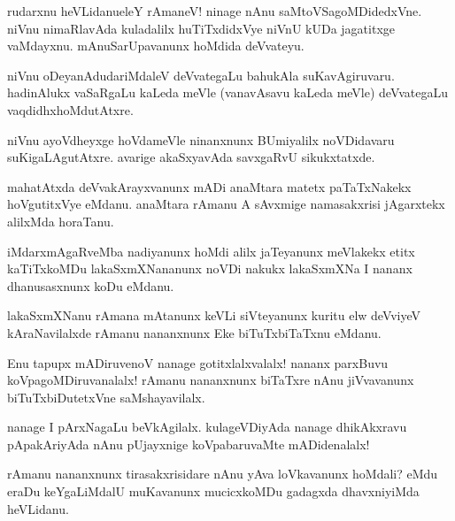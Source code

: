 \begin{mng}
rudarxnu heVLidanu\mdash eleY rAmaneV! ninage nAnu saMtoVSagoMDidedxVne. niVnu nimaRlavAda kuladalilx huTiTxdidxVye niVnU kUDa jagatitxge vaMdayxnu. mAnuSarUpavanunx hoMdida deVvateyu.
\end{mng}

\begin{mng}
niVnu oDeyanAdudariMdaleV deVvategaLu bahukAla suKavAgiruvaru. hadinAlukx vaSaRgaLu kaLeda meVle (vanavAsavu kaLeda meVle) deVvategaLu vaqdidhxhoMdutAtxre.
\end{mng}

\begin{mng}
niVnu ayoVdheyxge hoVdameVle ninanxnunx BUmiyalilx noVDidavaru suKigaLAgutAtxre. avarige akaSxyavAda savxgaRvU sikukxtatxde.
\end{mng}

\begin{mng}
mahatAtxda deVvakArayxvanunx mADi anaMtara matetx paTaTxNakekx hoVgutitxVye eMdanu. anaMtara rAmanu A sAvxmige namasakxrisi jAgarxtekx alilxMda horaTanu.
\end{mng}

\begin{mng}
iMdarxmAgaRveMba nadiyanunx hoMdi alilx jaTeyanunx meVlakekx etitx kaTiTxkoMDu lakaSxmXNananunx noVDi nakukx lakaSxmXNa I nananx dhanusasxnunx koDu eMdanu.
\end{mng}

\begin{mng}
lakaSxmXNanu rAmana mAtanunx keVLi siVteyanunx kuritu elw deVviyeV kAraNavilalxde rAmanu nananxnunx Eke biTuTxbiTaTxnu eMdanu.
\end{mng}

\begin{mng}
Enu tapupx mADiruvenoV nanage gotitxlalxvalalx! nananx parxBuvu koVpagoMDiruvanalalx! rAmanu nananxnunx biTaTxre nAnu jiVvavanunx biTuTxbiDutetxVne saMshayavilalx.
\end{mng}

\begin{mng}
nanage I pArxNagaLu beVkAgilalx. kulageVDiyAda nanage dhikAkxravu pApakAriyAda nAnu pUjayxnige koVpabaruvaMte mADidenalalx!
\end{mng}

\begin{mng}
rAmanu nananxnunx tirasakxrisidare nAnu yAva loVkavanunx hoMdali? eMdu eraDu keYgaLiMdalU muKavanunx mucicxkoMDu gadagxda dhavxniyiMda heVLidanu.
\end{mng}

